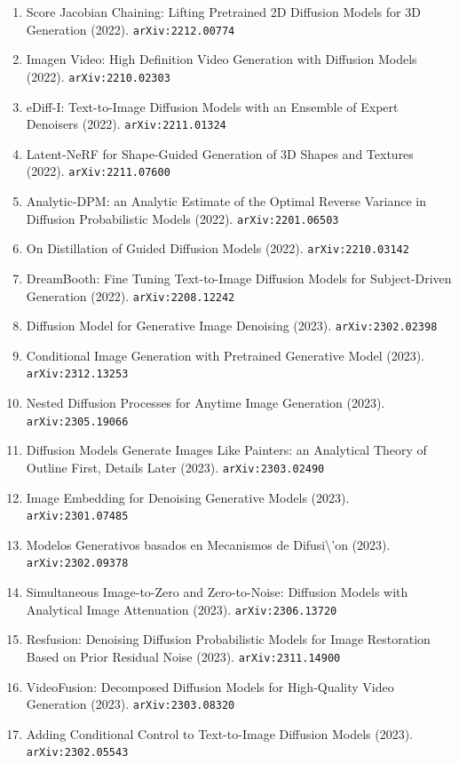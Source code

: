 \documentclass[11pt]{article}
\begin{document}
\begin{enumerate}
  \item Score Jacobian Chaining: Lifting Pretrained 2D Diffusion Models for 3D
  Generation (2022). \texttt{arXiv:2212.00774}
  \item Imagen Video: High Definition Video Generation with Diffusion Models (2022). \texttt{arXiv:2210.02303}
  \item eDiff-I: Text-to-Image Diffusion Models with an Ensemble of Expert
  Denoisers (2022). \texttt{arXiv:2211.01324}
  \item Latent-NeRF for Shape-Guided Generation of 3D Shapes and Textures (2022). \texttt{arXiv:2211.07600}
  \item Analytic-DPM: an Analytic Estimate of the Optimal Reverse Variance in
  Diffusion Probabilistic Models (2022). \texttt{arXiv:2201.06503}
  \item On Distillation of Guided Diffusion Models (2022). \texttt{arXiv:2210.03142}
  \item DreamBooth: Fine Tuning Text-to-Image Diffusion Models for
  Subject-Driven Generation (2022). \texttt{arXiv:2208.12242}
  \item Diffusion Model for Generative Image Denoising (2023). \texttt{arXiv:2302.02398}
  \item Conditional Image Generation with Pretrained Generative Model (2023). \texttt{arXiv:2312.13253}
  \item Nested Diffusion Processes for Anytime Image Generation (2023). \texttt{arXiv:2305.19066}
  \item Diffusion Models Generate Images Like Painters: an Analytical Theory of
  Outline First, Details Later (2023). \texttt{arXiv:2303.02490}
  \item Image Embedding for Denoising Generative Models (2023). \texttt{arXiv:2301.07485}
  \item Modelos Generativos basados en Mecanismos de Difusi\textbackslash{}'on (2023). \texttt{arXiv:2302.09378}
  \item Simultaneous Image-to-Zero and Zero-to-Noise: Diffusion Models with
  Analytical Image Attenuation (2023). \texttt{arXiv:2306.13720}
  \item Resfusion: Denoising Diffusion Probabilistic Models for Image
  Restoration Based on Prior Residual Noise (2023). \texttt{arXiv:2311.14900}
  \item VideoFusion: Decomposed Diffusion Models for High-Quality Video
  Generation (2023). \texttt{arXiv:2303.08320}
  \item Adding Conditional Control to Text-to-Image Diffusion Models (2023). \texttt{arXiv:2302.05543}

\end{enumerate}
\end{document}
